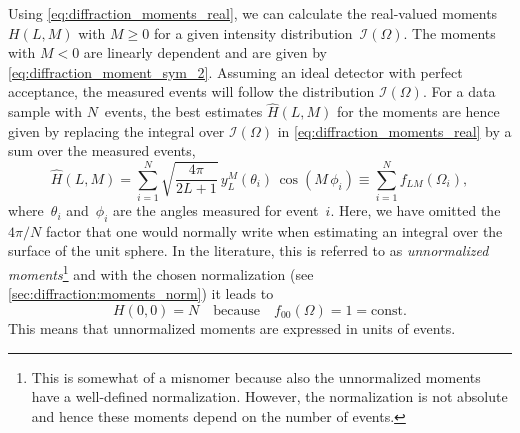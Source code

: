 Using \cref{eq:diffraction_moments_real}, we can calculate the
real-valued moments $H(L, M)$ with $M \geq 0$ for a given intensity
distribution~$\mathcal{I}(\Omega)$.  The moments with $M < 0$ are
linearly dependent and are given by
\cref{eq:diffraction_moment_sym_2}.  Assuming an ideal detector with
perfect acceptance, the measured events will follow the distribution
$\mathcal{I}(\Omega)$.  For a data sample with $N$~events, the best
estimates $\hat{H}(L, M)$ for the moments are hence given by replacing
the integral over $\mathcal{I}(\Omega)$ in
\cref{eq:diffraction_moments_real} by a sum over the measured events,
\ie
\begin{equation}
  \label{eq:diffraction_moments_estimate}
  \hat{H}(L, M)
  = \sum_{i = 1}^N \sqrt{\frac{4 \pi}{2 L + 1}}\, y_L^M(\theta_i)\, \cos(M\, \phi_i)
  \equiv \sum_{i = 1}^N f_{L M}(\Omega_i),
\end{equation}
where~$\theta_i$ and~$\phi_i$ are the angles measured for event~$i$.
Here, we have omitted the $4 \pi / N$ factor that one would normally
write when estimating an integral over the surface of the unit sphere.
In the literature, this is referred to as \emph{unnormalized
moments}\footnote{This is somewhat of a misnomer because also the
unnormalized moments have a well-defined normalization.  However, the
normalization is not absolute and hence these moments depend on the
number of events.} and with the chosen normalization (see
\cref{sec:diffraction:moments_norm}) it leads to
\begin{equation}
  \label{eq:diffraction_weight_00}
  H(0, 0)
  = N
  \quad\text{because}\quad
  f_{00}(\Omega)
  = 1
  = \text{const}.
\end{equation}
This
means that unnormalized moments are expressed in units of events.

